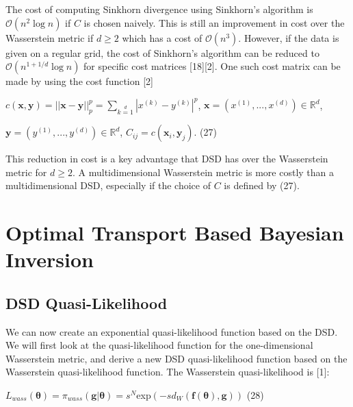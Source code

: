\documentclass[botnum, fleqn]{unmeethesis}
\begin{document}
The cost of computing Sinkhorn divergence using Sinkhorn's algorithm is $\mathcal{O}(n^2\log n)$ if $C$ is chosen naively. This is still an improvement in cost over the Wasserstein metric if $d\geq 2$ which has a cost of $\mathcal{O}(n^3)$. However, if the data is given on a regular grid, the cost of Sinkhorn's algorithm can be reduced to $\mathcal{O}(n^{1+1/d}\log n)$ for specific cost matrices [18][2]. One such cost matrix can be made by using the cost function [2]

\hspace{\fill}$c(\bm{x},\bm{y})=||\bm{x}-\bm{y}||_p^p=\sum\limits_{k=1}\limits^{d}|x^{(k)}-y^{(k)}|^p$, $\bm{x}=(x^{(1)},...,x^{(d)})\in\mathbb{R}^d$,\hspace{\fill} \normalsize 

\hspace{\fill} $\bm{y}=(y^{(1)},...,y^{(d)})\in\mathbb{R}^d$, $C_{ij}=c(\bm{x}_i,\bm{y}_j)$.\hspace{\fill} \normalsize (27)

This reduction in cost is a key advantage that DSD has over the Wasserstein metric for $d\geq 2$. A multidimensional Wasserstein metric is more costly than a multidimensional DSD, especially if the choice of $C$ is defined by (27). 

\chapter{Optimal Transport Based Bayesian Inversion}
\section{\label{section:DSD Quasi-Likelihood}DSD Quasi-Likelihood}
We can now create an exponential quasi-likelihood function based on the DSD. We will first look at the quasi-likelihood function for the one-dimensional Wasserstein metric, and derive a new DSD quasi-likelihood function based on the Wasserstein quasi-likelihood function. The Wasserstein quasi-likelihood is [1]:

\hspace{\fill}$L_{wass}(\bm{\theta})=\pi_{wass}(\bm{g}|\bm{\theta})=s^N$exp$(-sd_W(\bm{f}(\bm{\theta}),\bm{g}))$\hspace{\fill} \normalsize (28)
\end{document}

